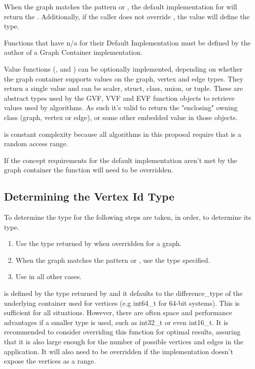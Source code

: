 When the graph matches the pattern  or ,
the default implementation for  will return the . Additionally, if the caller does not override 
, the  value will define the  type.

Functions that have n/a for their Default Implementation must be defined by the author of a Graph Container implementation. 

Value functions (,  and ) can be optionally implemented, 
depending on whether the graph container supports values on the graph, vertex and edge types. They return a single value and can 
be scaler, struct, class, union, or tuple. These are abstract types used by the GVF, VVF and EVF function objects to retrieve
values used by algorithms. As such it's valid to return the "enclosing" owning class (graph, vertex or edge), or some other
embedded value in those objects.

 is constant complexity because all algorithms in this proposal require that  is a random access range. 

If the concept requirements for the default implementation aren't met by the graph container the function will need to be overridden.

\subsection{Determining the Vertex Id Type}
To determine the type for  the following steps are taken, in order, to determine its type.
\begin{enumerate}
    \item Use the type returned by  when overridden for a graph.
    \item When the graph matches the pattern  or ,
          use the  type specified.
    \item Use  in all other cases.
\end{enumerate}

 is defined by the type returned by  and it defaults to the difference\_type of the underlying container used for vertices (e.g int64\_t for 64-bit systems). 
This is sufficient for all situations. However, there are often space and performance advantages if a smaller type is used, such as int32\_t or even int16\_t. It is recommended to consider overriding 
this function for optimal results, assuring that it is also large enough for the number of possible vertices and edges in the application. It will also need to be overridden if the implementation doesn't 
expose the vertices as a range.

